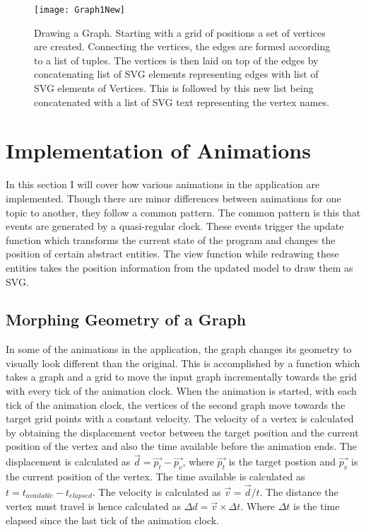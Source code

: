 \begin{figure}[!ht]
\centering
\texttt{[image: Graph1New]}
\caption{
         Drawing a Graph. Starting with a grid of positions
         a set of vertices are created. Connecting the vertices,
         the edges are formed according to a list of tuples. The 
         vertices is then laid on top of the edges by concatenating list
         of SVG elements representing edges with list of SVG elements
         of Vertices. This is followed by this new list being concatenated
         with a list of SVG text representing the vertex names.
        }
\end{figure}

\section{Implementation of Animations}
In this section I will cover how various animations in the
application are implemented. Though there are minor differences between animations
for one topic to another, they follow a common pattern. The common pattern is
this that events are generated by a quasi-regular clock. These events trigger
the update function which transforms the current state of the program and
changes the position of certain abstract entities. The view function while
redrawing these entities takes the position information from the updated model
to draw them as SVG.

\subsection{Morphing Geometry of a Graph}
\label{animation: morphing}
In some of the animations in the application, the graph changes its geometry
to visually look different than the original. This is accomplished by a
function which takes a graph and a grid to move the input graph incrementally
towards the grid with every tick of the animation clock.  When the animation is
started, with each tick of the animation clock, the vertices of the second
graph move towards the target grid points with a constant velocity.  The
velocity of a vertex is calculated by obtaining the displacement vector between
the target position and the current position of the vertex and also the time
available before the animation ends.  The displacement is calculated as
$\vec{d} = \vec{p_t} - \vec{p_v}$, where $\vec{p_t}$ is the target postion and
$\vec{p_v}$ is the current position of the vertex. The time available is
calculated as $t = t_{available} - t_{elapsed}$. The velocity is calculated as
$\vec{v} = \vec{d}/t$.  The distance the vertex must travel is hence calculated
as $\Delta d = \vec{v} \times \Delta t$.  Where $\Delta t$ is the time elapsed
since the last tick of the animation clock.


